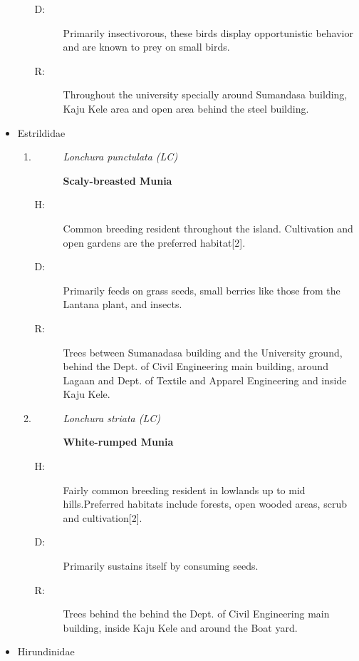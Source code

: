 \begin{itemize}
\begin{enumerate}
\begin{description}
\item[D: ]%
Primarily insectivorous, these birds display opportunistic behavior and are known to prey on small birds.%
\item[R: ]%
Throughout the university specially around Sumandasa building, Kaju Kele area and open area behind the steel building.%
\end{description}%
\end{enumerate}%
\item%
Estrildidae%
\begin{enumerate}%
\item%
\begin{description}%
\item[]%
\textit{Lonchura punctulata (LC)}%
\item[]%
\textbf{Scaly{-}breasted Munia}%
\end{description}%
\begin{description}%
\item[H: ]%
Common breeding resident throughout the island. Cultivation and open gardens are the preferred habitat{[}2{]}.%
\item[D: ]%
Primarily feeds on grass seeds, small berries like those from the Lantana plant, and insects.%
\item[R: ]%
Trees between Sumanadasa building and the University ground, behind the Dept. of Civil Engineering main building, around Lagaan and Dept. of Textile and Apparel Engineering and inside Kaju Kele.%
\end{description}%
\item%
\begin{description}%
\item[]%
\textit{Lonchura striata (LC)}%
\item[]%
\textbf{White{-}rumped Munia}%
\end{description}%
\begin{description}%
\item[H: ]%
Fairly common breeding resident in lowlands up to mid hills.Preferred habitats include forests, open wooded areas, scrub and cultivation{[}2{]}.%
\item[D: ]%
Primarily sustains itself by consuming seeds.%
\item[R: ]%
Trees behind the behind the Dept. of Civil Engineering main building, inside Kaju Kele and around the Boat yard.%
\end{description}%
\end{enumerate}%
\item%
Hirundinidae%

\end{itemize}
